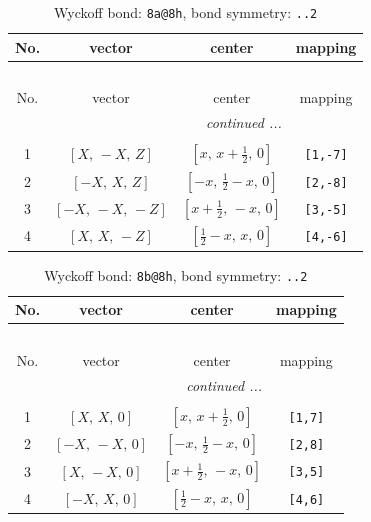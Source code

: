 \documentclass[fleqn,8pt]{jsarticle}
\begin{document}
\begin{longtable}{cccc}
\caption{Wyckoff bond: {\tt 8a@8h}, bond symmetry: {\tt ..2}}
 \\
 \hline \hline
No. & vector & center & mapping \\ \hline \endfirsthead

\multicolumn{3}{l}{\tablename\ \thetable{}} \\
 \hline \hline
No. & vector & center & mapping \\ \hline \endhead

 \hline \hline
\multicolumn{3}{r}{\footnotesize\it continued ...} \\ \endfoot

 \hline \hline
\multicolumn{3}{r}{} \\ \endlastfoot

1 & $\left[ X,\, - X,\, Z \right]$ & $\left[ x,\, x + \frac{1}{2},\, 0 \right]$ & {\tt [1,-7]} \\ \hline
2 & $\left[ - X,\, X,\, Z \right]$ & $\left[ - x,\, \frac{1}{2} - x,\, 0 \right]$ & {\tt [2,-8]} \\ \hline
3 & $\left[ - X,\, - X,\, - Z \right]$ & $\left[ x + \frac{1}{2},\, - x,\, 0 \right]$ & {\tt [3,-5]} \\ \hline
4 & $\left[ X,\, X,\, - Z \right]$ & $\left[ \frac{1}{2} - x,\, x,\, 0 \right]$ & {\tt [4,-6]} \\
\end{longtable}
\renewcommand{\arraystretch}{1.2}
\begin{longtable}{cccc}
\caption{Wyckoff bond: {\tt 8b@8h}, bond symmetry: {\tt ..2}}
 \\
 \hline \hline
No. & vector & center & mapping \\ \hline \endfirsthead

\multicolumn{3}{l}{\tablename\ \thetable{}} \\
 \hline \hline
No. & vector & center & mapping \\ \hline \endhead

 \hline \hline
\multicolumn{3}{r}{\footnotesize\it continued ...} \\ \endfoot

 \hline \hline
\multicolumn{3}{r}{} \\ \endlastfoot

1 & $\left[ X,\, X,\, 0 \right]$ & $\left[ x,\, x + \frac{1}{2},\, 0 \right]$ & {\tt [1,7]} \\ \hline
2 & $\left[ - X,\, - X,\, 0 \right]$ & $\left[ - x,\, \frac{1}{2} - x,\, 0 \right]$ & {\tt [2,8]} \\ \hline
3 & $\left[ X,\, - X,\, 0 \right]$ & $\left[ x + \frac{1}{2},\, - x,\, 0 \right]$ & {\tt [3,5]} \\ \hline
4 & $\left[ - X,\, X,\, 0 \right]$ & $\left[ \frac{1}{2} - x,\, x,\, 0 \right]$ & {\tt [4,6]} \\
\end{longtable}
\end{document}
